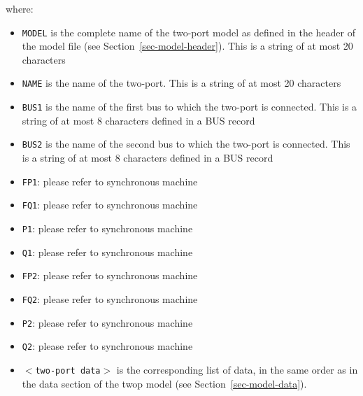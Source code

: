 where:
\begin{itemize}
\item{\tt MODEL} is the complete name of the two-port model as defined in the header of the model file (see Section~\ref{sec-model-header}). This is a string of at most 20 characters
\item{\tt NAME} is the name of the two-port.  This is a string of at most 20 characters
\item{\tt BUS1} is the name of the first bus to which the two-port is connected. This is a string of at most 8 characters defined in a BUS record
\item{\tt BUS2} is the name of the second bus to which the two-port is connected. This is a string of at most 8 characters defined in a BUS record
\item{\tt FP1}: please refer to synchronous machine
\item{\tt FQ1}: please refer to synchronous machine
\item{\tt P1}: please refer to synchronous machine
\item{\tt Q1}: please refer to synchronous machine
\item{\tt FP2}: please refer to synchronous machine
\item{\tt FQ2}: please refer to synchronous machine
\item{\tt P2}: please refer to synchronous machine
\item{\tt Q2}: please refer to synchronous machine
\item{\tt $<$two-port data$>$} is the corresponding list of data, in the same order as in the data section of the twop model (see Section~\ref{sec-model-data}).
\end{itemize}